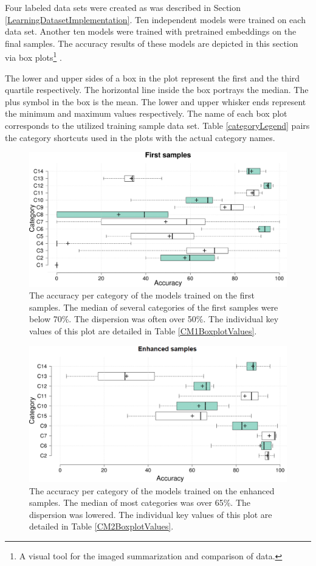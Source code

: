 Four labeled data sets were created as was described in Section \ref{LearningDatasetImplementation}. Ten independent models were trained on each data set. Another ten models were trained with pretrained embeddings on the final samples. The accuracy results of these models are depicted in this section via box plots\footnote{A visual tool for the imaged summarization and comparison of data.} \cite{boxplot}. 

The lower and upper sides of a box in the plot represent the first and the third quartile respectively. The horizontal line inside the box portrays the median. The plus symbol in the box is the mean. The lower and upper whisker ends represent the minimum and maximum values respectively. The name of each box plot corresponds to the utilized training sample data set. Table \ref{categoryLegend} pairs the category shortcuts used in the plots with the actual category names. 

 \begin{figure}[]
    \centering
    \label{CM1Boxplot}
    \includegraphics[width =\textwidth]{Images/CM1Boxplot.png}
    \caption{The accuracy per category of the models trained on the first samples. The median of several categories of the first samples were below 70\%. The dispersion was often over 50\%. The individual key values of this plot are detailed in Table \ref{CM1BoxplotValues}.}
    \label{CM1Boxplot}
\end{figure}


 \begin{figure}[]
    \centering
    \includegraphics[width =\textwidth]{Images/CM2Boxplot.png}
    \caption{The accuracy per category of the models trained on the enhanced samples. The median of most categories was over 65\%. The dispersion was lowered. The individual key values of this plot are detailed in Table \ref{CM2BoxplotValues}.}
    \label{CM2Boxplot}
\end{figure}

